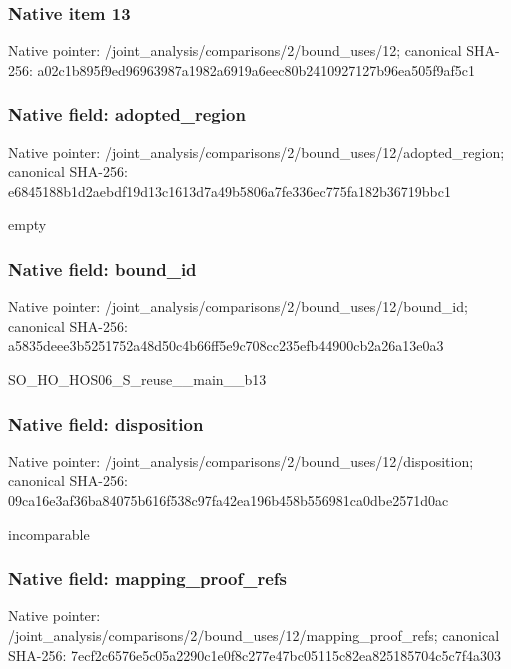 \documentclass[10pt,a4paper]{article}
\begin{document}
\subsubsection{Native item 13}
Native pointer: /joint\_\allowbreak{}analysis/comparisons/2/bound\_\allowbreak{}uses/12; canonical SHA-256: a02c1b895f9ed96963987a1982a6919a6eec80b2410927127b96ea505f9af5c1

\subsubsection{Native field: adopted\_\allowbreak{}region}
Native pointer: /joint\_\allowbreak{}analysis/comparisons/2/bound\_\allowbreak{}uses/12/adopted\_\allowbreak{}region; canonical SHA-256: e6845188b1d2aebdf19d13c1613d7a49b5806a7fe336ec775fa182b36719bbc1

\begingroup\raggedright\sloppy empty\par\endgroup

\subsubsection{Native field: bound\_\allowbreak{}id}
Native pointer: /joint\_\allowbreak{}analysis/comparisons/2/bound\_\allowbreak{}uses/12/bound\_\allowbreak{}id; canonical SHA-256: a5835deee3b5251752a48d50c4b66ff5e9c708cc235efb44900cb2a26a13e0a3

\begingroup\raggedright\sloppy SO\_\allowbreak{}HO\_\allowbreak{}HOS06\_\allowbreak{}S\_\allowbreak{}reuse\_\allowbreak{}\_\allowbreak{}main\_\allowbreak{}\_\allowbreak{}b13\par\endgroup

\subsubsection{Native field: disposition}
Native pointer: /joint\_\allowbreak{}analysis/comparisons/2/bound\_\allowbreak{}uses/12/disposition; canonical SHA-256: 09ca16e3af36ba84075b616f538c97fa42ea196b458b556981ca0dbe2571d0ac

\begingroup\raggedright\sloppy incomparable\par\endgroup

\subsubsection{Native field: mapping\_\allowbreak{}proof\_\allowbreak{}refs}
Native pointer: /joint\_\allowbreak{}analysis/comparisons/2/bound\_\allowbreak{}uses/12/mapping\_\allowbreak{}proof\_\allowbreak{}refs; canonical SHA-256: 7ecf2c6576e5c05a2290c1e0f8c277e47bc05115c82ea825185704c5c7f4a303
\end{document}
